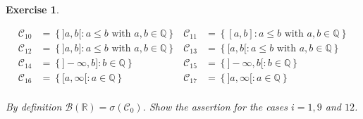 \documentclass[DIV=classic,a4paper,10pt]{scrartcl}
\newtheorem{exercise}[theorem]{Exercise}
\theoremstyle{nonumberplain}
\numberwithin{equation}{section}
\begin{document}
\begin{exercise}
\begin{enumerate}[label=(\alph*), fullwidth]
\begin{align*}
                \mathcal{C}_{10}&=\left\{]a,b[\colon a\leq b \text{ with } a,b\in \mathbb{Q}\right\} & \mathcal{C}_{11}&=\left\{[a,b]\colon a\leq b \text{ with } a,b\in \mathbb{Q}\right\}\\
                \mathcal{C}_{12}&=\left\{]a,b]\colon a\leq b \text{ with } a,b\in \mathbb{Q}\right\} & \mathcal{C}_{13}&=\left\{[a,b[\colon a\leq b \text{ with } a,b\in \mathbb{Q}\right\}\\
                \mathcal{C}_{14}&=\left\{]-\infty,b]\colon b\in \mathbb{Q}\right\} & \mathcal{C}_{15}&=\left\{]-\infty,b[\colon b\in \mathbb{Q}\right\}\\
                \mathcal{C}_{16}&=\left\{[a,\infty[\colon a\in \mathbb{Q}\right\} & \mathcal{C}_{17}&=\left\{]a,\infty[\colon a\in \mathbb{Q}\right\}\\
            \end{align*}

            By definition $\mathcal{B}(\mathbb{R})=\sigma(\mathcal{C}_0)$.
            Show the assertion for the cases $i=1,9$ and $12$.
    \end{enumerate}
\end{exercise}
\end{document}
